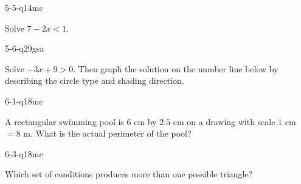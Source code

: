 \begin{practiceQuestion}{5-5-q14}{mc}
\begin{questionText}
Solve $7 - 2x < 1$.
\end{questionText}
\end{practiceQuestion}

\begin{practiceQuestion}{5-6-q29}{gsa}
\begin{questionText}
Solve $-3x + 9 > 0$. Then graph the solution on the number line below by describing the circle type and shading direction.

\begin{center}
\end{center}
\end{questionText}
\end{practiceQuestion}

\begin{practiceQuestion}{6-1-q18}{mc}
\begin{questionText}
A rectangular swimming pool is $6$ cm by $2.5$ cm on a drawing with scale $1$ cm $= 8$ m. What is the actual perimeter of the pool?
\end{questionText}
\end{practiceQuestion}

\begin{practiceQuestion}{6-3-q18}{mc}
\begin{questionText}
Which set of conditions produces more than one possible triangle?
\end{questionText}
\end{practiceQuestion}

